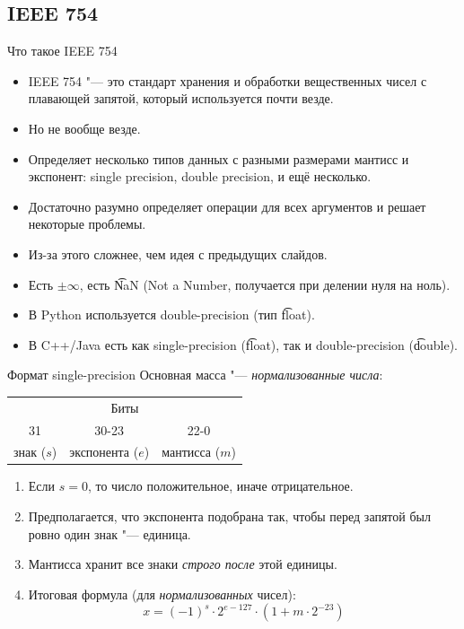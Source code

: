 \subsection{IEEE 754}
\begin{frame}
\end{frame}

\begin{frame}{Что такое IEEE 754}
	\begin{itemize}
		\item
			IEEE 754 "--- это стандарт хранения и обработки вещественных чисел с плавающей запятой, который используется почти везде.
		\item
			Но не вообще везде.
		\item
			Определяет несколько типов данных с разными размерами мантисс и экспонент: single precision, double precision, и ещё несколько.
		\item
			Достаточно разумно определяет операции для всех аргументов и решает некоторые проблемы.
		\item
			Из-за этого сложнее, чем идея с предыдущих слайдов.
		\item
			Есть $\pm \infty$, есть \t{NaN} (Not a Number, получается при делении нуля на ноль).
		\item
			В Python используется double-precision (тип \t{float}).
		\item
			В C++/Java есть как single-precision (\t{float}), так и double-precision (\t{double}).
	\end{itemize}
\end{frame}

\begin{frame}{Формат single-precision}
	Основная масса "--- \textit{нормализованные числа}:
	\begin{center}
		\begin{tabular}{c|c|c}
			\multicolumn{3}{c}{Биты} \\
			31 & 30-23 & 22-0 \\\hline
			знак ($s$) & экспонента ($e$) & мантисса ($m$) \\
		\end{tabular}
	\end{center}
	\begin{enumerate}
		\item
			Если $s=0$, то число положительное, иначе отрицательное.
		\item
			Предполагается, что экспонента подобрана так, чтобы перед запятой был ровно один знак "--- единица.
		\item
			Мантисса хранит все знаки \textit{строго после} этой единицы.
		\item
			Итоговая формула (для \textit{нормализованных} чисел):
			\[ x = (-1)^s \cdot 2^{e-127} \cdot (1 + m \cdot 2^{-23}) \]
	\end{enumerate}
\end{frame}

